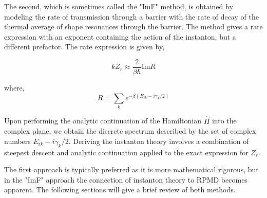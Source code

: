 \documentclass[phd,tocprelim]{cornell}
\begin{document}
The second, which is sometimes called the "ImF" method,  is obtained by modeling the rate of transmission through a barrier with the rate of decay of the thermal average of  shape resonances through the barrier. The method gives a rate expression with an exponent containing the action of the instanton, but a different prefactor. The rate expression is given by,

\begin{equation}
k Z_r \approx \frac{2}{\beta \hbar} \textrm{Im} R
\end{equation} 

where, 
\begin{equation}
R = \sum_k e^{-\beta (E_{{\textrm{r}} k} -i\gamma_k/2)}
\end{equation} 

Upon performing the analytic continuation of the Hamiltonian $\hat{H}$ into the complex plane, we obtain the discrete spectrum described by the set of complex numbers $E_{{\textrm{r}} k} -i\gamma_k/2$. Deriving the instanton theory involves  a combination of steepest descent and analytic continuation applied to the exact expression for $Z_r$.

The first approach is typically preferred as it is more mathematical rigorous, but in the "ImF" approach the connection of instanton theory to RPMD becomes apparent. The following sections will give a brief review of both methods. 
\end{document}
